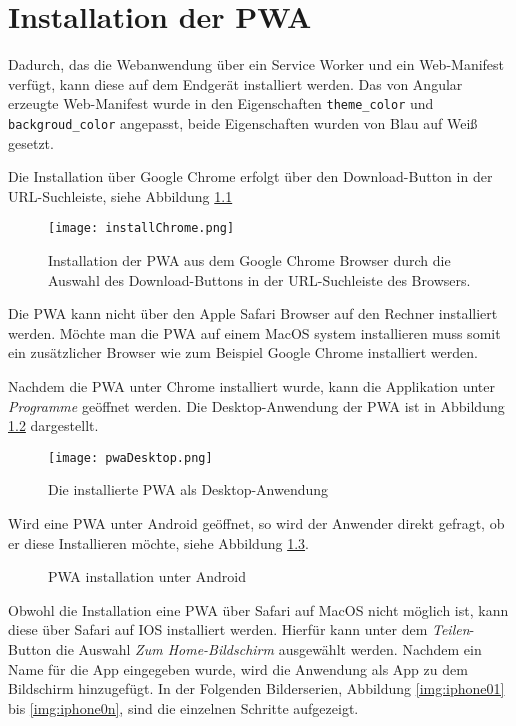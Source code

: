 \chapter{Installation der PWA}

Dadurch, das die Webanwendung über ein Service Worker und ein Web-Manifest verfügt, kann diese auf dem Endgerät installiert werden. Das von Angular erzeugte Web-Manifest wurde in den Eigenschaften \texttt{theme\_color} und \texttt{backgroud\_color} angepasst, beide Eigenschaften wurden von Blau auf Weiß gesetzt.

Die Installation über Google Chrome erfolgt über den Download-Button in der URL-Suchleiste, siehe Abbildung \ref{img:installChrome}

\begin{figure}[!htb]
    \centering
    \texttt{[image: installChrome.png]}
    \caption{Installation der PWA aus dem Google Chrome Browser durch die Auswahl des Download-Buttons in der URL-Suchleiste des Browsers.}
    \label{img:installChrome}
\end{figure}

Die PWA kann nicht über den Apple Safari Browser auf den Rechner installiert werden. Möchte man die PWA auf einem MacOS system installieren muss somit ein zusätzlicher Browser wie zum Beispiel Google Chrome installiert werden. 

Nachdem die PWA unter Chrome installiert wurde, kann die Applikation unter \textit{Programme} geöffnet werden. Die Desktop-Anwendung der PWA ist in Abbildung \ref{img:desktopPwa} dargestellt.

\begin{figure}[!htb]
    \centering
    \texttt{[image: pwaDesktop.png]}
    \caption{Die installierte PWA als Desktop-Anwendung}
    \label{img:desktopPwa}
\end{figure}


Wird eine PWA unter Android geöffnet, so wird der Anwender direkt gefragt, ob er diese Installieren möchte, siehe Abbildung \ref{img:installAndroid}.

\begin{figure}%
    \centering
    \qquad
    \caption{PWA installation unter Android}%
    \label{img:installAndroid}
  \end{figure}

Obwohl die Installation eine PWA über Safari auf MacOS nicht möglich ist, kann diese über Safari auf IOS installiert werden. Hierfür kann unter dem \textit{Teilen}-Button die Auswahl \textit{Zum Home-Bildschirm} ausgewählt werden. Nachdem ein Name für die App eingegeben wurde, wird die Anwendung als App zu dem Bildschirm hinzugefügt. In der Folgenden Bilderserien, Abbildung \ref{img:iphone01} bis \ref{img:iphone0n}, sind die einzelnen Schritte aufgezeigt. 

